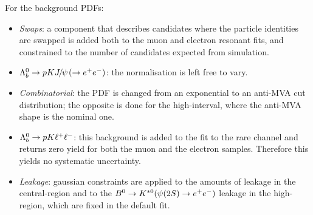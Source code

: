 For the background PDFs:
%
\begin{itemize}

\item \textit{Swaps}: a component that describes candidates where the particle identities are swapped
is added both to the muon and electron resonant fits, and constrained to the number of candidates
expected from simulation. 

\item $\Lb\to pK\jpsi(\to \ee)$: the normalisation is left free to vary.



\item \textit{Combinatorial}: the PDF is changed from an exponential to an anti-MVA
cut distribution; the opposite is done for the high-\qsq interval, where the anti-MVA shape is the nominal one. 

\item ${{\Lambda}^0_{b}}\rightarrow pK \ell^+ \ell^-$: this background is added to the fit to the rare channel and returns zero yield for both the muon and the electron samples.
Therefore this yields no systematic uncertainty.

\item \textit{Leakage}: gaussian constraints are applied to the amounts of \BdToKstJPsee leakage in the central-\qsq region
 and to the $\Bz\to\Kstarz(\psitwos\to \ee)$ leakage in the high-\qsq region, which are fixed in the default fit.

\end{itemize}

